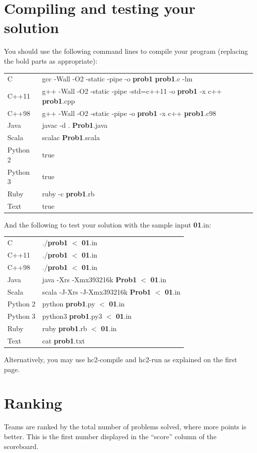 \section{Compiling and testing your solution}
You should use the following command lines to compile your program
(replacing the bold parts as appropriate):
\begin{center}
\begin{tabular}{l|p{14cm}}
C&
gcc -Wall -O2 -static -pipe -o \textbf{prob1} \textbf{prob1}.c -lm \\
C++11&
g++ -Wall -O2 -static -pipe -std=c++11 -o \textbf{prob1} -x c++ \textbf{prob1}.cpp \\
C++98&
g++ -Wall -O2 -static -pipe -o \textbf{prob1} -x c++ \textbf{prob1}.c98 \\
Java&
javac -d . \textbf{Prob1}.java\\
Scala&
scalac \textbf{Prob1}.scala\\
Python 2&
true\\
Python 3&
true\\
Ruby&
ruby -c \textbf{prob1}.rb\\
Text&
true\\
\end{tabular}
\end{center}
And the following to test your solution with the sample input \textbf{01}.in:
\begin{center}
\begin{tabular}{l|p{14cm}}
C&
./\textbf{prob1} $<$ \textbf{01}.in\\
C++11&
./\textbf{prob1} $<$ \textbf{01}.in\\
C++98&
./\textbf{prob1} $<$ \textbf{01}.in\\
Java&
java -Xrs -Xmx393216k \textbf{Prob1} $<$ \textbf{01}.in\\
Scala&
scala -J-Xrs -J-Xmx393216k \textbf{Prob1} $<$ \textbf{01}.in\\
Python 2&
python \textbf{prob1}.py $<$ \textbf{01}.in\\
Python 3&
python3 \textbf{prob1}.py3 $<$ \textbf{01}.in\\
Ruby&
ruby \textbf{prob1}.rb $<$ \textbf{01}.in\\
Text&
cat \textbf{prob1}.txt \\
\end{tabular}
\end{center}
Alternatively, you may use hc2-compile and hc2-run as explained on the first page.

\section{Ranking}
Teams are ranked by the total number of problems solved, where more points is better. This is the first number displayed in the ``score'' column of the scoreboard.

